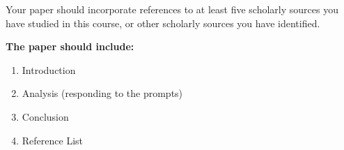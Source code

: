 \documentclass[
]{book}
\providecommand{\tightlist}{%
  \setlength{\itemsep}{0pt}\setlength{\parskip}{0pt}}
\begin{document}
\begin{assessment}
Your paper should incorporate references to at least five scholarly
sources you have studied in this course, or other scholarly sources you
have identified.

\textbf{The paper should include:}

\begin{enumerate}
\def\labelenumi{\arabic{enumi}.}
\tightlist
\item
  Introduction\\
\item
  Analysis (responding to the prompts)\\
\item
  Conclusion\\
\item
  Reference List
\end{enumerate}
\end{assessment}
\end{document}
